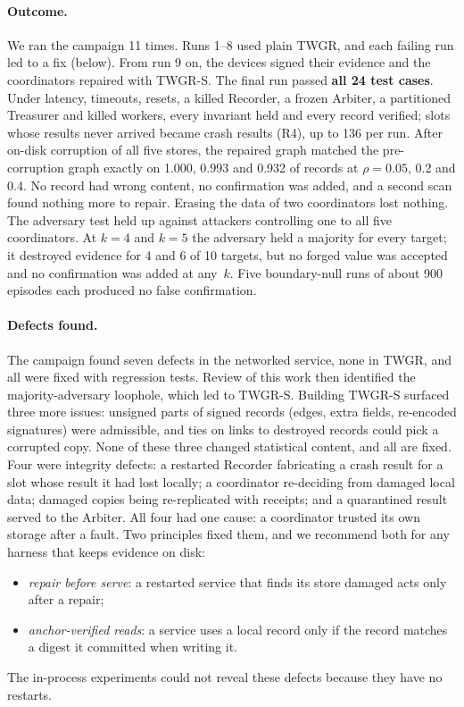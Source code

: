 \documentclass[11pt]{article}
\theoremstyle{definition}
\begin{document}
\paragraph{Outcome.} We ran the campaign 11 times. Runs 1--8 used plain TWGR, and each failing run led to a fix (below). From run 9 on, the devices signed their evidence and the coordinators repaired with TWGR-S. The final run passed \textbf{all 24 test cases}. Under latency, timeouts, resets, a killed Recorder, a frozen Arbiter, a partitioned Treasurer and killed workers, every invariant held and every record verified; slots whose results never arrived became crash results (R4), up to 136 per run. After on-disk corruption of all five stores, the repaired graph matched the pre-corruption graph exactly on 1.000, 0.993 and 0.932 of records at $\rho=0.05$, 0.2 and 0.4. No record had wrong content, no confirmation was added, and a second scan found nothing more to repair. Erasing the data of two coordinators lost nothing. The adversary test held up against attackers controlling one to all five coordinators. At $k=4$ and $k=5$ the adversary held a majority for every target; it destroyed evidence for 4 and 6 of 10 targets, but no forged value was accepted and no confirmation was added at any~$k$. Five boundary-null runs of about 900 episodes each produced no false confirmation.

\paragraph{Defects found.} The campaign found seven defects in the networked service, none in TWGR, and all were fixed with regression tests. Review of this work then identified the majority-adversary loophole, which led to TWGR-S. Building TWGR-S surfaced three more issues: unsigned parts of signed records (edges, extra fields, re-encoded signatures) were admissible, and ties on links to destroyed records could pick a corrupted copy. None of these three changed statistical content, and all are fixed. Four were integrity defects: a restarted Recorder fabricating a crash result for a slot whose result it had lost locally; a coordinator re-deciding from damaged local data; damaged copies being re-replicated with receipts; and a quarantined result served to the Arbiter. All four had one cause: a coordinator trusted its own storage after a fault. Two principles fixed them, and we recommend both for any harness that keeps evidence on disk:
\begin{itemize}
\item \emph{repair before serve}: a restarted service that finds its store damaged acts only after a repair;
\item \emph{anchor-verified reads}: a service uses a local record only if the record matches a digest it committed when writing it.
\end{itemize}
The in-process experiments could not reveal these defects because they have no restarts.
\end{document}
